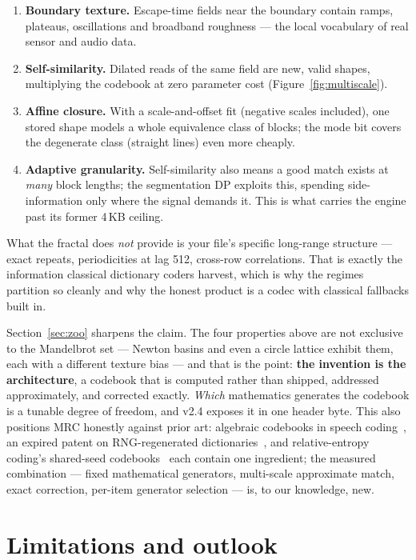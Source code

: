 \documentclass[11pt,a4paper]{article}
\begin{document}
\begin{enumerate}
\item \textbf{Boundary texture.} Escape-time fields near the boundary contain
ramps, plateaus, oscillations and broadband roughness --- the local vocabulary
of real sensor and audio data.
\item \textbf{Self-similarity.} Dilated reads of the same field are new,
valid shapes, multiplying the codebook at zero parameter cost
(Figure~\ref{fig:multiscale}).
\item \textbf{Affine closure.} With a scale-and-offset fit (negative scales
included), one stored shape models a whole equivalence class of blocks; the
mode bit covers the degenerate class (straight lines) even more cheaply.
\item \textbf{Adaptive granularity.} Self-similarity also means a good match
exists at \emph{many} block lengths; the segmentation DP exploits this,
spending side-information only where the signal demands it. This is what
carries the engine past its former 4\,KB ceiling.
\end{enumerate}

What the fractal does \emph{not} provide is your file's specific long-range
structure --- exact repeats, periodicities at lag 512, cross-row correlations.
That is exactly the information classical dictionary coders harvest, which is
why the regimes partition so cleanly and why the honest product is a codec
with classical fallbacks built in.

Section~\ref{sec:zoo} sharpens the claim. The four properties above are not
exclusive to the Mandelbrot set --- Newton basins and even a circle lattice
exhibit them, each with a different texture bias --- and that is the point:
\textbf{the invention is the architecture}, a codebook that is computed rather
than shipped, addressed approximately, and corrected exactly. \emph{Which}
mathematics generates the codebook is a tunable degree of freedom, and v2.4
exposes it in one header byte. This also positions MRC honestly against prior
art: algebraic codebooks in speech coding~\cite{acelp}, an expired patent on
RNG-regenerated dictionaries~\cite{aronov}, and relative-entropy coding's
shared-seed codebooks~\cite{rec} each contain one ingredient; the measured
combination --- fixed mathematical generators, multi-scale approximate match,
exact correction, per-item generator selection --- is, to our knowledge, new.

\section{Limitations and outlook}
\end{document}
